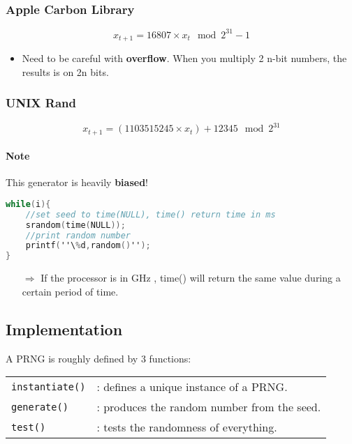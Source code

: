 \subsubsection{Apple Carbon Library}
$$x_{t+1} = 16807 \times x_t \mod 2^{31} -1 $$

\begin{itemize}
    \item Need to be careful with \textbf{overflow}. 
        When you multiply 2 n-bit numbers, the results is on 2n bits.
        \end{itemize}

\subsubsection{UNIX Rand}
$$x_{t+1} = (1103515245 \times x_t) + 12345 \mod 2^{31}$$
\paragraph{Note} This generator is heavily \textbf{biased}!

\begin{lstlisting}[frame=single,language=C]
while(i){
	//set seed to time(NULL), time() return time in ms
	srandom(time(NULL)); 
	//print random number
	printf(''\%d,random()'');
}
\end{lstlisting}
\begin{itemize}
    \item[$\Rightarrow$] If the processor is in GHz , time() will return the
        same value during a certain period of time.
\end{itemize}


\subsection{Implementation}

A PRNG is roughly defined by 3 functions: \begin{tabular}{ll}
    \texttt{instantiate()} & : defines a unique instance of a PRNG.\\
    \texttt{generate()} & :  produces the random number from the seed.\\
    \texttt{test()} & : tests the randomness of everything.\\
\end{tabular}
